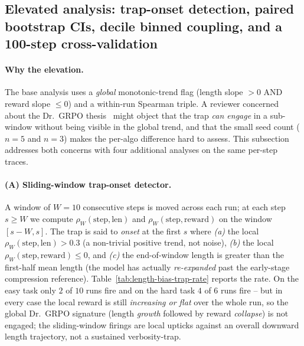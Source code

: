 \documentclass{article}
\begin{document}
\subsection{Elevated analysis: trap-onset detection, paired bootstrap CIs, decile binned coupling, and a 100-step cross-validation}
\label{sec:length-bias-elevated}

\paragraph{Why the elevation.}
The base analysis uses a \emph{global} monotonic-trend flag
(length slope $>0$ AND reward slope $\le 0$) and a within-run
Spearman triple. A reviewer concerned about the
Dr.~GRPO thesis~\cite{tong2025drgrpo} might object that the trap
\emph{can engage} in a sub-window without being visible in the
global trend, and that the small seed count ($n{=}5$ and $n{=}3$)
makes the per-algo difference hard to assess. This subsection
addresses both concerns with four additional analyses on the same
per-step traces.

\paragraph{(A) Sliding-window trap-onset detector.}
A window of $W{=}10$ consecutive steps is moved across each run;
at each step $s\ge W$ we compute $\rho_W(\text{step},\text{len})$
and $\rho_W(\text{step},\text{reward})$ on the window $[s-W,s]$.
The trap is said to \emph{onset} at the first $s$ where
\emph{(a)} the local $\rho_W(\text{step},\text{len})>0.3$ (a
non-trivial positive trend, not noise), \emph{(b)} the local
$\rho_W(\text{step},\text{reward})\le 0$, and \emph{(c)} the
end-of-window length is greater than the first-half mean length
(the model has actually \emph{re-expanded} past the early-stage
compression reference). Table~\ref{tab:length-bias-trap-rate}
reports the rate. On the easy task only $2$ of $10$ runs fire and
on the hard task $4$ of $6$ runs fire -- but in every case the
local reward is still \emph{increasing or flat} over the whole
run, so the global Dr.~GRPO signature (length \emph{growth}
followed by reward \emph{collapse}) is not engaged; the
sliding-window firings are local upticks against an overall
downward length trajectory, not a sustained verbosity-trap.
\end{document}
